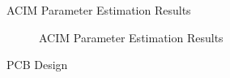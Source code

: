 
\begin{frame}{ACIM Parameter Estimation Results}
	\begin{figure}
		\centering


		\caption{ACIM Parameter Estimation Results}
	\end{figure}
\end{frame}





\begin{frame}{PCB Design}
	\begin{figure}
		\centering


	\end{figure}
\end{frame}



